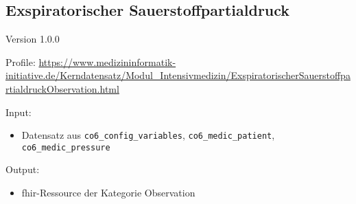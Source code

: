 \subsection{Exspiratorischer Sauerstoffpartialdruck} 
\noindent Version 1.0.0

\noindent Profile: \url{https://www.medizininformatik-initiative.de/Kerndatensatz/Modul_Intensivmedizin/ExspiratorischerSauerstoffpartialdruckObservation.html}

\noindent Input:
\begin{itemize}
	\item Datensatz aus \texttt{co6\_config\_variables}, \texttt{co6\_medic\_patient}, \\ \texttt{co6\_medic\_pressure}
\end{itemize}
Output:
\begin{itemize}
        \item \ac{fhir}-Ressource der Kategorie \glqq Observation\grqq{}
\end{itemize}

